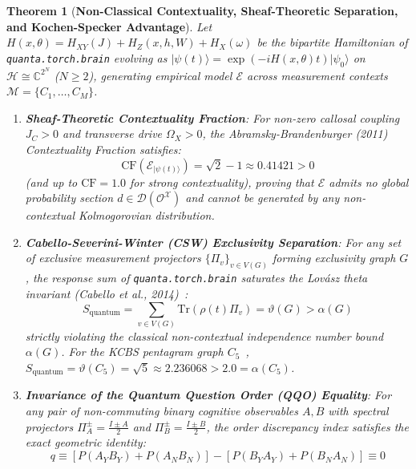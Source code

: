 \documentclass[10pt,twocolumn,3p]{article}
\newtheorem{theorem}{Theorem}
\begin{document}
\begin{theorem}[\textbf{Non-Classical Contextuality, Sheaf-Theoretic Separation, and Kochen-Specker Advantage}]
\label{thm:contextuality_separation}
Let $H(x, \theta) = H_{XY}(J) + H_Z(x, h, W) + H_X(\omega)$ be the bipartite Hamiltonian of \texttt{quanta.torch.brain} evolving as $|\psi(t)\rangle = \exp(-i H(x, \theta) t) |\psi_0\rangle$ on $\mathcal{H} \cong \mathbb{C}^{2^N}$ ($N \ge 2$), generating empirical model $\mathcal{E}$ across measurement contexts $\mathcal{M} = \{C_1, \dots, C_M\}$.
\begin{enumerate}
    \item \textbf{Sheaf-Theoretic Contextuality Fraction}: For non-zero callosal coupling $J_C > 0$ and transverse drive $\Omega_X > 0$, the Abramsky-Brandenburger (2011)~\cite{abramsky2011} Contextuality Fraction satisfies:
    \begin{equation}
        \text{CF}(\mathcal{E}_{|\psi(t)\rangle}) = \sqrt{2} - 1 \approx 0.41421 > 0
    \end{equation}
    (and up to $\text{CF} = 1.0$ for strong contextuality), proving that $\mathcal{E}$ admits no global probability section $d \in \mathcal{D}(\mathcal{O}^{\mathcal{X}})$ and cannot be generated by any non-contextual Kolmogorovian distribution.
    \item \textbf{Cabello-Severini-Winter (CSW) Exclusivity Separation}: For any set of exclusive measurement projectors $\{\Pi_v\}_{v \in V(G)}$ forming exclusivity graph $G$, the response sum of \texttt{quanta.torch.brain} saturates the Lov\'asz theta invariant (Cabello et al., 2014)~\cite{cabello2014}:
    \begin{equation}
        S_{\text{quantum}} = \sum_{v \in V(G)} \text{Tr}(\rho(t) \Pi_v) = \vartheta(G) > \alpha(G)
    \end{equation}
    strictly violating the classical non-contextual independence number bound $\alpha(G)$. For the KCBS pentagram graph $C_5$~\cite{kcbs2008}, $S_{\text{quantum}} = \vartheta(C_5) = \sqrt{5} \approx 2.236068 > 2.0 = \alpha(C_5)$.
    \item \textbf{Invariance of the Quantum Question Order (QQO) Equality}: For any pair of non-commuting binary cognitive observables $A, B$ with spectral projectors $\Pi_A^\pm = \frac{I \pm A}{2}$ and $\Pi_B^\pm = \frac{I \pm B}{2}$, the order discrepancy index satisfies the exact geometric identity:
    \begin{equation}
        q \equiv [P(A_Y B_Y) + P(A_N B_N)] - [P(B_Y A_Y) + P(B_N A_N)] \equiv 0
    \end{equation}

\end{enumerate}
\end{theorem}
\end{document}
